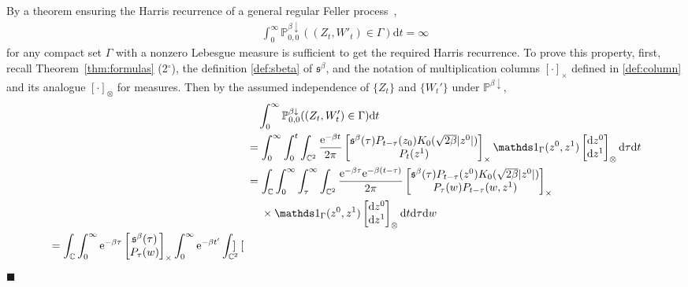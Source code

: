 \documentclass[12pt, twoside]{article}
\numberwithin{figure}{section}
\newcommand{\e}{{\mathrm e}}
\newcommand{\1}{\mathds 1}
\newcommand{\da}{{\downarrow}}
\renewcommand{\P}{{\mathbb P}}
\renewcommand{\d}{{\mathrm d}}
\newcommand{\2}{{\mathbf 1}}
\newcommand{\s}{{\mathfrak s}}
\renewenvironment{proof}[1][\proofname]{\noindent {\bfseries #1.}\;}{\hfill\ensuremath{\blacksquare}\\}
\newcommand{\cc}{{^\circ}}
\begin{document}
\begin{proof}[Proof of Theorem~\ref{thm:ht} (1$\cc$)]
By a theorem ensuring the Harris recurrence of a general regular Feller process~\cite[Theorem~20.17, pp.405--406]{K:FMP}, 
\begin{align}
\int_0^\infty \P^{\beta\da}_{0,0}((Z_t,W'_t)\in \Gamma)\d t=\infty\label{Harris}
\end{align}
for any compact set $\Gamma$ with a nonzero Lebesgue measure is sufficient to get the required Harris recurrence. To prove this property, first, recall Theorem~\ref{thm:formulas} (2$\cc$), the definition \eqref{def:sbeta} of $\s^\beta$, 
 and the notation of multiplication columns $[\cdot]_\times$ defined in \eqref{def:column} and its analogue $[\cdot]_{\otimes}$ for measures. Then by  the assumed independence of $\{Z_t\}$ and $ \{W_t'\}$ under $\P^{\beta\da}$,
\begin{align}
&\quad \int_0^\infty  \P^{\beta\da}_{0,0}((Z_t,W'_t)\in \Gamma)\d t\notag\\
&=\int_0^\infty \int_0^{t} \int_{\Bbb C^2}\frac{\e^{-\beta t}}{2\pi }
\begin{bmatrix}
 \s^\beta(\tau)P_{t-\tau}(z_0)K_0(\sqrt{2\beta}|z^0|)\\
P_{t}(z^1)
\end{bmatrix}_\times 
\1_\Gamma(z^0,z^1)\begin{bmatrix}
\d z^0\\
\d z^1
\end{bmatrix}_{\otimes}\d \tau\d t\notag\\
&=\int_{\Bbb C}\int_0^\infty \int_\tau^\infty 
\int_{\Bbb C^2}\frac{\e^{-\beta \tau}\e^{-\beta(t-\tau)}}{2\pi }
\begin{bmatrix}
\s^\beta(\tau)P_{t-\tau}(z^0)K_0(\sqrt{2\beta}|z^0|)\\
P_{\tau}(w)P_{t-\tau}(w,z^1)
\end{bmatrix}_\times\notag\\
&\quad\;\times \1_\Gamma(z^0,z^1)\begin{bmatrix}
\d z^0\\
\d z^1
\end{bmatrix}_{\otimes}\d t\d  \tau\d w\notag\\
\begin{split}
&=\int_{\Bbb C}
\int_0^\infty \e^{-\beta \tau}
\begin{bmatrix}
 \s^\beta(\tau)\\
P_{\tau}(w)
\end{bmatrix}_\times\int_0^\infty   \e^{-\beta t'}
\int_{\Bbb C^2}
\begin{bmatrix}

\end{bmatrix}
\end{split}
\end{align}
\end{proof}
\end{document}
